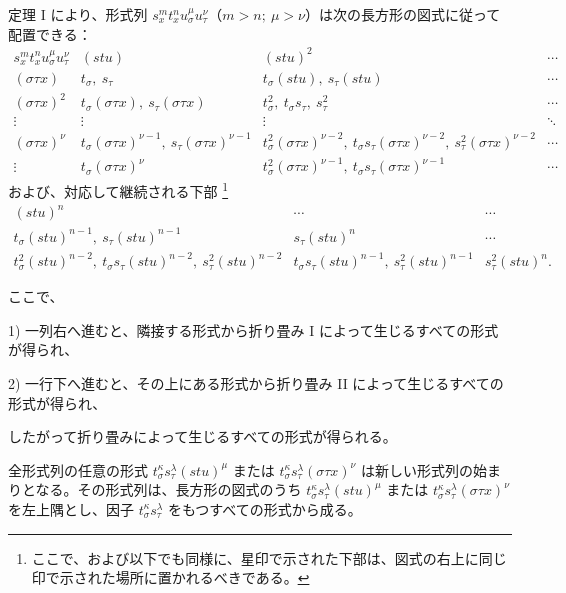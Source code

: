\documentclass[11pt]{jlreq}
\begin{document}
定理 I により、形式列 $s_x^m t_x^n u_\sigma^\mu u_\tau^\nu$（$m>n;\ \mu>\nu$）は次の長方形の図式に従って配置できる：
\begingroup\small
\[
\begin{array}{c|c|c|c}
s_x^m t_x^n u_\sigma^\mu u_\tau^\nu
& (stu)
& (stu)^2
& \cdots\\[0.3em]
(\sigma\tau x)
& t_\sigma,\ s_\tau
& t_\sigma(stu),\ s_\tau(stu)
& \cdots\\[0.3em]
(\sigma\tau x)^2
& t_\sigma(\sigma\tau x),\ s_\tau(\sigma\tau x)
& t_\sigma^2,\ t_\sigma s_\tau,\ s_\tau^2
& \cdots\\[0.3em]
\vdots&\vdots&\vdots&\ddots\\[0.3em]
(\sigma\tau x)^\nu
& t_\sigma(\sigma\tau x)^{\nu-1},\ s_\tau(\sigma\tau x)^{\nu-1}
& t_\sigma^2(\sigma\tau x)^{\nu-2},\ t_\sigma s_\tau(\sigma\tau x)^{\nu-2},\ s_\tau^2(\sigma\tau x)^{\nu-2}
& \cdots\\[0.3em]
\vdots
& t_\sigma(\sigma\tau x)^\nu
& t_\sigma^2(\sigma\tau x)^{\nu-1},\ t_\sigma s_\tau(\sigma\tau x)^{\nu-1}
& \cdots
\end{array}
\]
\endgroup
および、対応して継続される下部
\footnote{ここで、および以下でも同様に、星印で示された下部は、図式の右上に同じ印で示された場所に置かれるべきである。}
\begingroup\small
\[
\begin{array}{c|c|c}
(stu)^n & \cdots & \cdots\\[0.3em]
t_\sigma(stu)^{n-1},\ s_\tau(stu)^{n-1}
& s_\tau(stu)^n & \cdots\\[0.3em]
t_\sigma^2(stu)^{n-2},\ t_\sigma s_\tau(stu)^{n-2},\ s_\tau^2(stu)^{n-2}
& t_\sigma s_\tau(stu)^{n-1},\ s_\tau^2(stu)^{n-1}
& s_\tau^2(stu)^n .
\end{array}
\]
\endgroup

ここで、

1) 一列右へ進むと、隣接する形式から折り畳み I によって生じるすべての形式が得られ、

2) 一行下へ進むと、その上にある形式から折り畳み II によって生じるすべての形式が得られ、

したがって折り畳みによって生じるすべての形式が得られる。

全形式列の任意の形式 $t_\sigma^\kappa s_\tau^\lambda(stu)^\mu$ または $t_\sigma^\kappa s_\tau^\lambda(\sigma\tau x)^\nu$ は新しい形式列の始まりとなる。その形式列は、長方形の図式のうち $t_\sigma^\kappa s_\tau^\lambda(stu)^\mu$ または $t_\sigma^\kappa s_\tau^\lambda(\sigma\tau x)^\nu$ を左上隅とし、因子 $t_\sigma^\kappa s_\tau^\lambda$ をもつすべての形式から成る。
\end{document}
